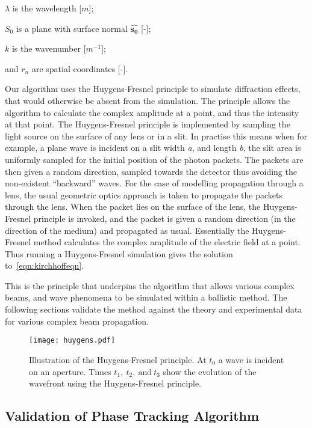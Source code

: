     \indent $\lambda$ is the wavelength [$m$];

    \indent $S_0$ is a plane with surface normal $\mathbf{\hat{s_0}}$ [-];

    \indent $k$ is the wavenumber [$m^{-1}$];

    \indent and $r_n$ are spatial coordinates [-]. 

\medskip

Our algorithm uses the Huygens-Fresnel principle to simulate diffraction effects, that would otherwise be absent from the simulation.
The principle allows the algorithm to calculate the complex amplitude at a point, and thus the intensity at that point.
The Huygens-Fresnel principle is implemented by sampling the light source on the surface of any lens or in a slit.
In practise this means when for example, a plane wave is incident on a slit width \textit{a}, and length \textit{b}, the slit area is uniformly sampled for the initial position of the photon packets.
The packets are then given a random direction, sampled towards the detector thus avoiding the non-existent ``backward'' waves.
For the case of modelling propagation through a lens, the usual geometric optics approach is taken to propagate the packets through the lens.
When the packet lies on the surface of the lens, the Huygens-Fresnel principle is invoked, and the packet is given a random direction (in the direction of the medium) and propagated as usual.
Essentially the Huygens-Fresnel method calculates the complex amplitude of the electric field at a point.
Thus running a Huygens-Fresnel simulation gives the solution to~\cref{eqn:kirchhoffeqn}.

\medskip

This is the principle that underpins the algorithm that allows various complex beams, and wave phenomena to be simulated within a ballistic method. The following sections validate the method against the theory and experimental data for various complex beam propagation.

\begin{figure}[!ht]
    \centering
    \texttt{[image: huygens.pdf]}
    \caption{Illustration of the Huygens-Fresnel principle. At $t_0$ a wave is incident on an aperture. Times $t_1,\ t_2,\ \text{and}\ t_3$ show the evolution of the wavefront using the Huygens-Fresnel principle.}
    \label{fig:huygensillis}
\end{figure}

\subsection{Validation of Phase Tracking Algorithm}

